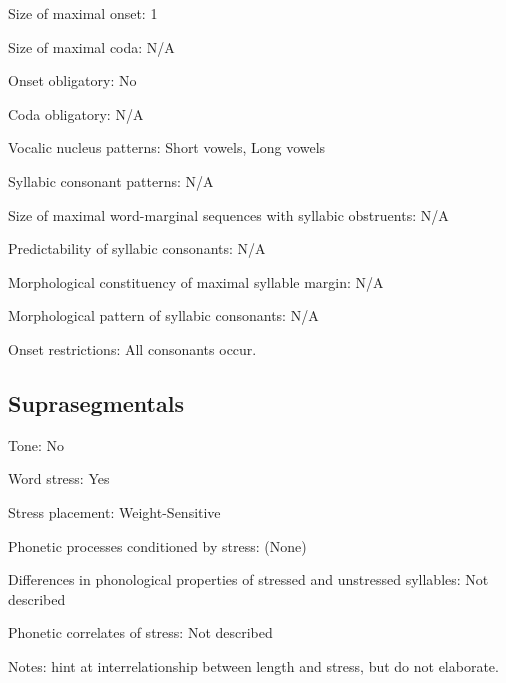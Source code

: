 {\begin{appendixdesc}
\item[Size of maximal onset:] 1

\item[Size of maximal coda:] N/A

\item[Onset obligatory:] No

\item[Coda obligatory:] N/A

\item[Vocalic nucleus patterns:] Short vowels, Long vowels

\item[Syllabic consonant patterns:] N/A

\item[Size of maximal word-marginal sequences with syllabic obstruents:] N/A

\item[Predictability of syllabic consonants:] N/A

\item[Morphological constituency of maximal syllable margin:] N/A

\item[Morphological pattern of syllabic consonants:] N/A

\item[Onset restrictions:] All consonants occur.
\end{appendixdesc}
\subsection*{Suprasegmentals}
\begin{appendixdesc}
\item[Tone:] No

\item[Word stress:] Yes

\item[Stress placement:] Weight-Sensitive

\item[Phonetic processes conditioned by stress:] (None)

\item[Differences in phonological properties of stressed and unstressed syllables:] Not described

\item[Phonetic correlates of stress:] Not described

\item[Notes:] \citet[271]{FirchowFirchow1969} hint at interrelationship between length and stress, but do not elaborate.
\end{appendixdesc}
}
